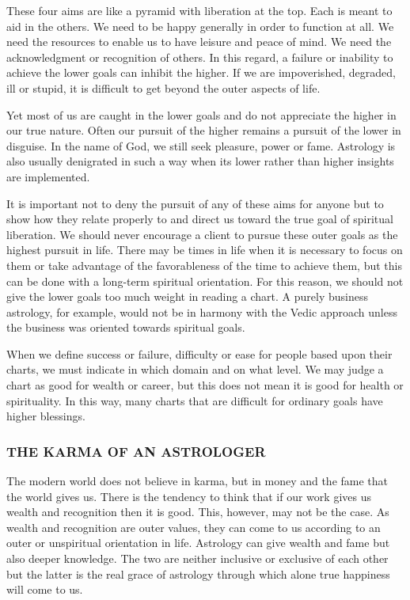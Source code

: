  

These four aims are like a pyramid with liberation at the top. Each is meant to aid in the others. We need to be happy generally in order to function at all. We need the resources to enable us to have leisure and peace of mind. We need the acknowledgment or recognition of others. In this regard, a failure or inability to achieve the lower goals can inhibit the higher. If we are impoverished, degraded, ill or stupid, it is difficult to get beyond the outer aspects of life.

 

Yet most of us are caught in the lower goals and do not appreciate the higher in our true nature. Often our pursuit of the higher remains a pursuit of the lower in disguise. In the name of God, we still seek pleasure, power or fame. Astrology is also usually denigrated in such a way when its lower rather than higher insights are implemented.

 

It is important not to deny the pursuit of any of these aims for anyone but to show how they relate properly to and direct us toward the true goal of spiritual liberation. We should never encourage a client to pursue these outer goals as the highest pursuit in life. There may be times in life when it is necessary to focus on them or take advantage of the favorableness of the time to achieve them, but this can be done with a long-term spiritual orientation. For this reason, we should not give the lower goals too much weight in reading a chart. A purely business astrology, for example, would not be in harmony with the Vedic approach unless the business was oriented towards spiritual goals.

 

When we define success or failure, difficulty or ease for people based upon their charts, we must indicate in which domain and on what level. We may judge a chart as good for wealth or career, but this does not mean it is good for health or spirituality. In this way, many charts that are difficult for ordinary goals have higher blessings.

 

\subsubsection{THE KARMA OF AN ASTROLOGER}

 

The modern world does not believe in karma, but in money and the fame that the world gives us. There is the tendency to think that if our work gives us wealth and recognition then it is good. This, however, may not be the case. As wealth and recognition are outer values, they can come to us according to an outer or unspiritual orientation in life. Astrology can give wealth and fame but also deeper knowledge. The two are neither inclusive or exclusive of each other but the latter is the real grace of astrology through which alone true happiness will come to us.

